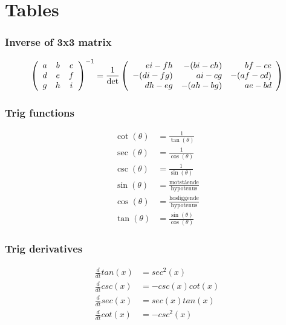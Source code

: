 \part{Tables}

\section{Inverse of 3x3 matrix}
\begin{equation}
\left(\begin{array}{ccc}
    a & b & c\\
    d & e & f\\
    g & h &i
\end{array}\right)^{-1}
=
{\frac{1}{\rm{det}}}
\left(\begin{array}{rrr}
    e i - f h & -(b i - c h) & b f - c e\\
    -(d i - f g) & a i - c g & -(a f -c d)\\
    d h - e g & -(a h - b g) & a e - b d
\end{array}\right)
\end{equation}


\section{Trig functions}
\begin{align}
    \cot(\theta) &= \frac{1}{\tan(\theta)}\\
    \sec(\theta) &= \frac{1}{\cos(\theta)}\\
    \csc(\theta) &= \frac{1}{\sin(\theta)}\\
    \sin(\theta) &= \frac{\text{motstående}}{\text{hypotenus}}\\
    \cos(\theta) &= \frac{\text{hosliggende}}{\text{hypotenus}}\\
    \tan(\theta) &= \frac{\sin(\theta)}{\cos(\theta)}
\end{align}

\section{Trig derivatives}
\begin{align}
    \frac{d}{dt}tan(x) &= sec^2(x) \\
    \frac{d}{dt}csc(x) &= -csc(x)cot(x) \\
    \frac{d}{dt}sec(x) &= sec(x)tan(x) \\
    \frac{d}{dt}cot(x) &= -csc^2(x)
\end{align}



